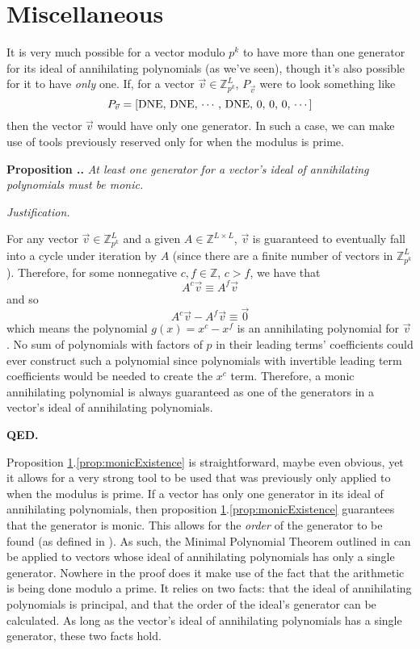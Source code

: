 \documentclass[a4paper, reqno, 12pt]{amsart}
\newcommand\DNE{\textup{DNE}}
\newcounter{propcounter}[section]
\newenvironment{proposition}[1]
{
	\refstepcounter{propcounter}
	\textbf{Proposition \thesection.\thepropcounter.} \emph{#1}
	
	\emph{Justification.}
}
{
	\textbf{QED.} \\
}
\begin{document}
	\section{Miscellaneous}
		\label{sec:M}
		It is very much possible for a vector modulo $p^k$ to have more than one generator for its ideal of annihilating polynomials (as we've seen), though it's also
		possible for it to have \emph{only} one. If, for a vector $\vec{v} \in \mathds{Z}_{p^k}^L$, $P_{\vec{v}}$ were to look something like
		\[
			P_{\vec{v}} = [\DNE,\, \DNE,\, \cdots,\, \DNE,\, 0,\, 0,\, 0,\, \cdots]
		\]
		then the vector $\vec{v}$ would have only one generator. In such a case, we can make use of tools previously reserved only for when the modulus is prime. 
		
		\begin{proposition}{At least one generator for a vector's ideal of annihilating polynomials must be monic.}
			\label{prop:monicExistence}
			For any vector $\vec{v} \in \mathds{Z}_{p^k}^L$ and a given $A \in \mathds{Z}^{L \times L}$, $\vec{v}$ is guaranteed to eventually fall into a cycle under 
			iteration by $A$ (since there are a finite number of vectors in $\mathds{Z}_{p^k}^L$). Therefore, for some nonnegative $c,f \in \mathds{Z}$, $c > f$, we have that
			\[
				A^c\vec{v} \equiv A^f\vec{v}
			\]
			and so
			\[
				A^c\vec{v} - A^f\vec{v} \equiv \vec{0}
			\]
			which means the polynomial $g(x) = x^c - x^f$ is an annihilating polynomial for $\vec{v}$. No sum of polynomials with factors of $p$ in their leading terms' 
			coefficients could ever construct such a polynomial since polynomials with invertible leading term coefficients would be needed to create the $x^c$ term. 
			Therefore, a monic annihilating polynomial is always guaranteed as one of the generators in a vector's ideal of annihilating polynomials.
		\end{proposition}
		
		Proposition \ref{sec:M}.\ref{prop:monicExistence} is straightforward, maybe even obvious, yet it allows for a very strong tool to be used that was previously only
		applied to when the modulus is prime. If a vector has only one generator in its ideal of annihilating polynomials, then proposition 
		\ref{sec:M}.\ref{prop:monicExistence} guarantees that the generator is monic. This allows for the \emph{order} of the generator to be found (as defined in 
		\citet{Patterson2008}). As such, the Minimal Polynomial Theorem outlined in \citet{Patterson2008} can be applied to vectors whose ideal of annihilating polynomials 
		has only a single generator. Nowhere in the proof does it make use of the fact that the arithmetic is being done modulo a prime. It relies on two facts: that 
		the ideal of annihilating polynomials is principal, and that the order of the ideal's generator can be calculated. As long as the vector's ideal of annihilating 
		polynomials has a single generator, these two facts hold.
	
	
	
\end{document}
